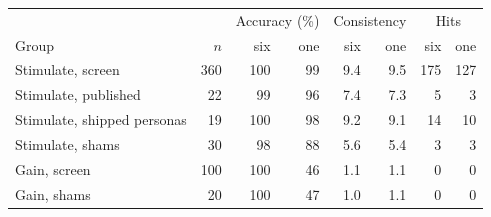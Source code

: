 \begin{tabular}{@{}lrrrrrrr@{}}\toprule & & \multicolumn{2}{c}{Accuracy (\%)} & \multicolumn{2}{c}{Consistency} & \multicolumn{2}{c}{Hits} \\
Group & $n$ & six & one & six & one & six & one \\ \midrule
Stimulate, screen & 360 & 100 & 99 & 9.4 & 9.5 & 175 & 127 \\
Stimulate, published & 22 & 99 & 96 & 7.4 & 7.3 & 5 & 3 \\
Stimulate, shipped personas & 19 & 100 & 98 & 9.2 & 9.1 & 14 & 10 \\
Stimulate, shams & 30 & 98 & 88 & 5.6 & 5.4 & 3 & 3 \\
Gain, screen & 100 & 100 & 46 & 1.1 & 1.1 & 0 & 0 \\
Gain, shams & 20 & 100 & 47 & 1.0 & 1.1 & 0 & 0 \\
\bottomrule\end{tabular}
